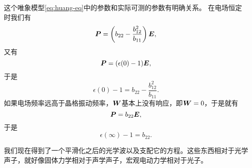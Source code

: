 这个唯象模型\eqref{eq:huang-eq}中的参数和实际可测的参数有明确关系。
在电场恒定时我们有
\[
    \vb*{P} = \left( b_{22} - \frac{b_{12}^2}{b_{11}} \right) \vb*{E},
\]
又有
\[
    \vb*{P} = (\epsilon(0) - 1) \vb*{E},
\]
于是
\begin{equation}
    \epsilon(0) - 1 = b_{22} - \frac{b_{12}^2}{b_{11}}.
\end{equation}
如果电场频率远高于晶格振动频率，$\vb*{W}$基本上没有响应，即$\vb*{W}=0$，于是就有
\[
    \vb*{P} = b_{22} \vb*{E},
\]
于是
\begin{equation}
    \epsilon(\infty) - 1 = b_{22}.
\end{equation}

我们现在得到了一个平滑化之后的光学波以及支配它的方程。这些东西相对于光学声子，就好像固体力学相对于声学声子，宏观电动力学相对于光子。

